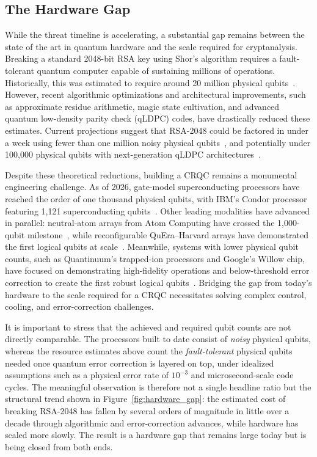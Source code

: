 \subsection{The Hardware Gap}

While the threat timeline is accelerating, a substantial gap remains between the state of the art in quantum hardware and the scale required for cryptanalysis. Breaking a standard 2048-bit RSA key using Shor's algorithm requires a fault-tolerant quantum computer capable of sustaining millions of operations. Historically, this was estimated to require around 20 million physical qubits~\cite{gidney2021factoring}.
However, recent algorithmic optimizations and architectural improvements, such as approximate residue arithmetic, magic state cultivation, and advanced quantum low-density parity check (qLDPC) codes, have drastically reduced these estimates. Current projections suggest that RSA-2048 could be factored in under a week using fewer than one million noisy physical qubits~\cite{gidney2025how}, and potentially under 100,000 physical qubits with next-generation qLDPC architectures~\cite{webster2026pinnacle}.

Despite these theoretical reductions, building a CRQC remains a monumental engineering challenge. As of 2026, gate-model superconducting processors have reached the order of one thousand physical qubits, with IBM's Condor processor featuring 1,121 superconducting qubits~\cite{ibmcondor2023}.
Other leading modalities have advanced in parallel: neutral-atom arrays from Atom Computing have crossed the 1,000-qubit milestone~\cite{atomcomputing2023}, while reconfigurable QuEra--Harvard arrays have demonstrated the first logical qubits at scale~\cite{bluvstein2024logical}.
Meanwhile, systems with lower physical qubit counts, such as Quantinuum's trapped-ion processors and Google's Willow chip, have focused on demonstrating high-fidelity operations and below-threshold error correction to create the first robust logical qubits~\cite{moses2023racetrack,googleqai2025below}.
Bridging the gap from today's hardware to the scale required for a CRQC necessitates solving complex control, cooling, and error-correction challenges.

It is important to stress that the achieved and required qubit counts are not directly comparable. The processors built to date consist of \emph{noisy} physical qubits, whereas the resource estimates above count the \emph{fault-tolerant} physical qubits needed once quantum error correction is layered on top, under idealized assumptions such as a physical error rate of $10^{-3}$ and microsecond-scale code cycles. The meaningful observation is therefore not a single headline ratio but the structural trend shown in Figure~\ref{fig:hardware_gap}: the estimated cost of breaking RSA-2048 has fallen by several orders of magnitude in little over a decade through algorithmic and error-correction advances, while hardware has scaled more slowly. The result is a hardware gap that remains large today but is being closed from both ends.

